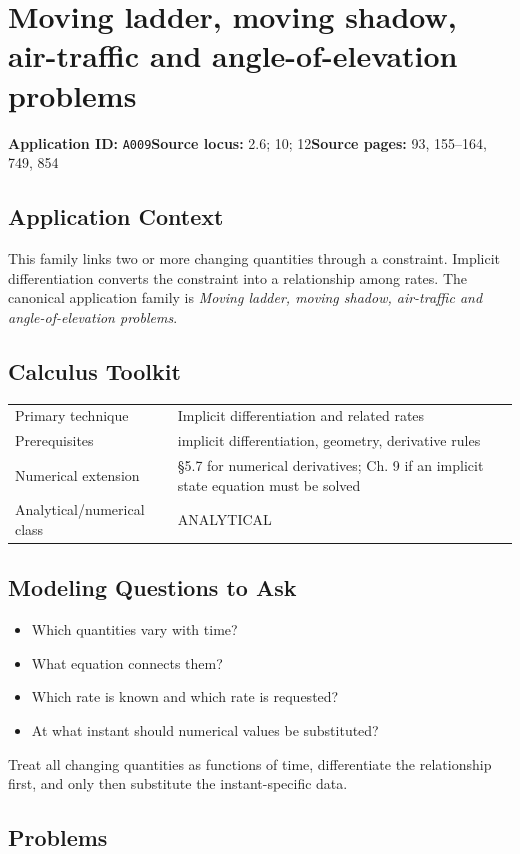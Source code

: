 \documentclass[11pt]{book}
\newcommand{\pid}[1]{\texttt{#1}}
\begin{document}
\chapter{Moving ladder, moving shadow, air-traffic and angle-of-elevation problems}\label{app:A009}
\textbf{Application ID:} \pid{A009}\quad \textbf{Source locus:} 2.6; 10; 12\quad \textbf{Source pages:} 93, 155–164, 749, 854
\section*{Application Context}
This family links two or more changing quantities through a constraint. Implicit differentiation converts the constraint into a relationship among rates. The canonical application family is \emph{Moving ladder, moving shadow, air-traffic and angle-of-elevation problems}.
\section*{Calculus Toolkit}
\begin{tabularx}{\textwidth}{@{}lX@{}}\toprule
Primary technique & Implicit differentiation and related rates \\
Prerequisites & implicit differentiation, geometry, derivative rules \\
Numerical extension & §5.7 for numerical derivatives; Ch. 9 if an implicit state equation must be solved \\
Analytical/numerical class & ANALYTICAL \\
\bottomrule\end{tabularx}
\section*{Modeling Questions to Ask}\begin{itemize}
\item Which quantities vary with time?
\item What equation connects them?
\item Which rate is known and which rate is requested?
\item At what instant should numerical values be substituted?
\end{itemize}
\begin{errorbox}Treat all changing quantities as functions of time, differentiate the relationship first, and only then substitute the instant-specific data.\end{errorbox}
\section*{Problems}
\end{document}
